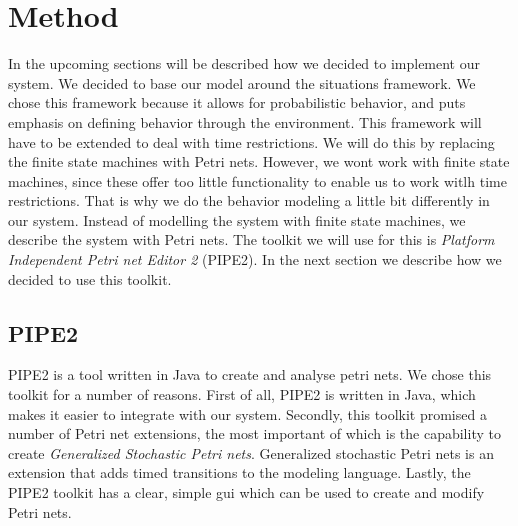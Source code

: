 \documentclass[11pt]{article}
\begin{document}
\section{Method}
In the upcoming sections will be described how we decided to implement our system. We decided to base our model around the situations framework. We chose this framework because it allows for probabilistic behavior, and puts emphasis on defining behavior through the environment. This framework will have to be extended to deal with time restrictions. We will do this by replacing the finite state machines with Petri nets. However, we wont work with finite state machines, since these offer too little functionality to enable us to work witlh time restrictions. That is why we do the behavior modeling a little bit differently in our system. Instead of modelling the system with finite state machines, we describe the system with Petri nets.  The toolkit we will use for this is \emph{Platform Independent Petri net Editor 2} (PIPE2).  In the next section we describe how we decided to use this toolkit.

\subsection{PIPE2}
PIPE2 is a tool written in Java to create and analyse petri nets. We chose this toolkit for a number of reasons. First of all, PIPE2 is written in Java, which makes it easier to integrate with our system. Secondly, this toolkit promised a number of Petri net extensions, the most important of which is the capability to create \emph{Generalized Stochastic Petri nets}. Generalized stochastic Petri nets is an extension that adds timed transitions to the modeling language.
Lastly, the PIPE2 toolkit has a clear, simple gui which can be used to create and modify Petri nets. 


\end{document}
